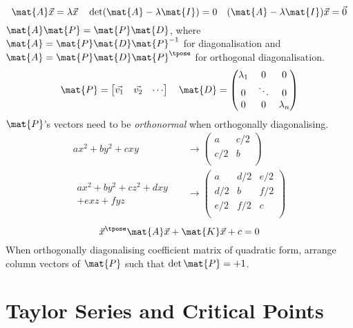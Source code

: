 \documentclass[10pt, a4paper]{article}
\begin{document}
\begin{landscape}
\begin{multicols}{3}
    \[
        \mat{A}\vec{x} = \lambda \vec{x} \quad \det (\mat{A} - \lambda \mat{I})
        = 0 \quad (\mat{A} - \lambda \mat{I}) \vec{x} = \vec{0}
    \]
    \(\mat{A}\mat{P} = \mat{P}\mat{D}\), where \(\mat{A} = \mat{P}\mat{D}\mat{P}^{-1}\) for diagonalisation and
    \(\mat{A} = \mat{P}\mat{D}\mat{P}^{\tpose}\) for orthogonal diagonalisation.
    \[
        \mat{P} = \begin{bmatrix}
            \vec{v_1} & \vec{v_2} & \cdots \\ 
        \end{bmatrix}
        \quad
        \mat{D} = \begin{pmatrix}
            \lambda_1 & 0 & 0 \\ 
            0 & \ddots & 0 \\ 
            0 & 0 & \lambda_{n} \\ 
        \end{pmatrix}
    \]
    \(\mat{P}\)'s vectors need to be \emph{orthonormal} when orthogonally diagonalising.
    \begin{align*}
        ax^{2} + by^{2} + cxy &\longrightarrow \begin{pmatrix}
            a & c/2 \\ 
            c/2 & b \\ 
        \end{pmatrix} \\
        \begin{aligned}
            ax^{2} + by^{2} + cz^{2} + dxy& \\
            + exz + fyz &
        \end{aligned}
         &\longrightarrow \begin{pmatrix}
            a & d/2 & e/2 \\ 
            d/2 & b & f/2 \\ 
            e/2 & f/2 & c \\ 
        \end{pmatrix}
    \end{align*}
    \[\vec{x}^{\tpose} \mat{A} \vec{x} + \mat{K} \vec{x} + c = 0\]
    When orthogonally diagonalising coefficient matrix of quadratic form, arrange column vectors of
    \(\mat{P}\) such that \(\det \mat{P} = +1\).

    \section{Taylor Series and Critical Points}


\end{multicols}
\end{landscape}
\end{document}
